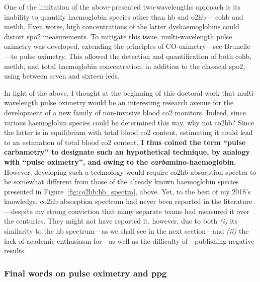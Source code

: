 One of the limitation of the above-presented two-wavelengths approach is its inability to quantify haemoglobin species other than \gls{hb} and \gls{o2hb}---\eg{} \gls{cohb} and \gls{methb}. Even worse, high concentrations of the latter dyshaemoglobins could distort \gls{spo2} measurements\cite{wukitsch1987, ralston1991}. To mitigate this issue, multi-wavelength pulse oximetry was developed, extending the principles of CO-oximetry---see Brunelle \etal{}\cite{brunelle1996}---to pulse oximetry. This allowed the detection and quantification of both \gls{cohb}, \gls{methb}, and total haemoglobin concentration, in addition to the classical \gls{spo2}, using between seven and sixteen \glspl{led}\cite{manzke1996, suzaki2006, katja2011}.

In light of the above, I thought at the beginning of this doctoral work that multi-wavelength pulse oximetry would be an interesting research avenue for the development of a new family of non-invasive blood \gls{co2} monitors. Indeed, since various haemoglobin species could be determined this way, why not \gls{co2hb}? Since the latter is in equilibrium with total blood \gls{co2} content, estimating it could lead to an estimation of total blood \gls{co2} content. \textbf{I thus coined the term \enquote{pulse carbametry} to designate such an hypothetical technique, by analogy with \enquote{pulse oximetry}, and owing to the \emph{carba}mino-haemoglobin.} However, developing such a technology would require \gls{co2hb} absorption spectra to be somewhat different from those of the already known haemoglobin species presented in Figure~\ref{fig:co2hb:hb_spectra}, above. Yet, to the best of my 2018's knowledge, \gls{co2hb} absorption spectrum had never been reported in the literature---despite my strong conviction that many separate teams had measured it over the centuries. They might not have reported it, however, due to both \textit{(i)} its similarity to the \gls{hb} spectrum---as we shall see in the next section---and \textit{(ii)} the lack of academic enthusiasm for---as well as the difficulty of---publishing negative results.

\subsubsection{Final words on pulse oximetry and \texorpdfstring{\gls{ppg}}{PPG}}

